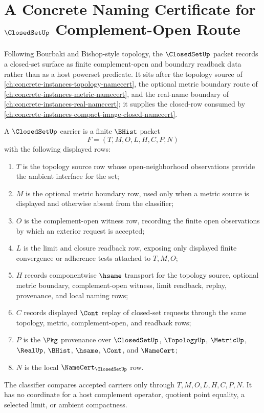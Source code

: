 \chapter{A Concrete Naming Certificate for $\ClosedSetUp$ Complement-Open Route}
\label{ch:concrete-instances-closed-set-namecert}

Following Bourbaki and Bishop-style topology, the $\ClosedSetUp$ packet records a closed-set surface as finite complement-open and boundary readback data rather than as a host powerset predicate. It sits after the topology source of \autoref{ch:concrete-instances-topology-namecert}, the optional metric boundary route of \autoref{ch:concrete-instances-metric-namecert}, and the real-name boundary of \autoref{ch:concrete-instances-real-namecert}; it supplies the closed-row consumed by \autoref{ch:concrete-instances-compact-image-closed-namecert}.

\begin{definition}
\label{def:closed-set-carrier}
A $\ClosedSetUp$ carrier is a finite $\BHist$ packet
$$
F=(T,M,O,L,H,C,P,N)
$$
with the following displayed rows:
\begin{enumerate}
\item $T$ is the topology source row whose open-neighborhood observations provide the ambient interface for the set;
\item $M$ is the optional metric boundary row, used only when a metric source is displayed and otherwise absent from the classifier;
\item $O$ is the complement-open witness row, recording the finite open observations by which an exterior request is accepted;
\item $L$ is the limit and closure readback row, exposing only displayed finite convergence or adherence tests attached to $T,M,O$;
\item $H$ records componentwise $\hsame$ transport for the topology source, optional metric boundary, complement-open witness, limit readback, replay, provenance, and local naming rows;
\item $C$ records displayed $\Cont$ replay of closed-set requests through the same topology, metric, complement-open, and readback rows;
\item $P$ is the $\Pkg$ provenance over $\ClosedSetUp$, $\TopologyUp$, $\MetricUp$, $\RealUp$, $\BHist$, $\hsame$, $\Cont$, and $\NameCert$;
\item $N$ is the local $\NameCert_{\ClosedSetUp}$ row.
\end{enumerate}
The classifier compares accepted carriers only through $T,M,O,L,H,C,P,N$. It has no coordinate for a host complement operator, quotient point equality, a selected limit, or ambient compactness.
\end{definition}

